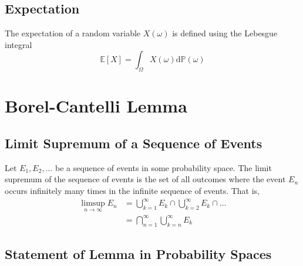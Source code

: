 \documentclass[11pt]{report} %
\begin{document}
\subsection{Expectation}

The expectation of a random variable $X\left(\omega\right)$ is defined using the Lebesgue integral
\begin{equation}
\mathbb{E}\left[X\right] = \int_{\Omega}X\left(\omega\right)\mathrm{d}\mathbb{P}\left(\omega\right)
\end{equation}

\section{Borel-Cantelli Lemma}

\subsection{Limit Supremum of a Sequence of Events}

Let $E_{1}, E_{2}, \dots$ be a sequence of events in some probability space. The limit supremum of the sequence of events is the set of all outcomes where the event $E_{n}$ occurs infinitely many times in the infinite sequence of events. That is,
\begin{align}
\limsup_{n\to\infty}E_{n} &= \bigcup_{k = 1}^{\infty}E_{k} \cap \bigcup_{k = 2}^{\infty}E_{k} \cap \dots \\
&= \bigcap_{n = 1}^{\infty}\bigcup_{k = n}^{\infty}E_{k}
\end{align}

\subsection{Statement of Lemma in Probability Spaces}
\end{document}
